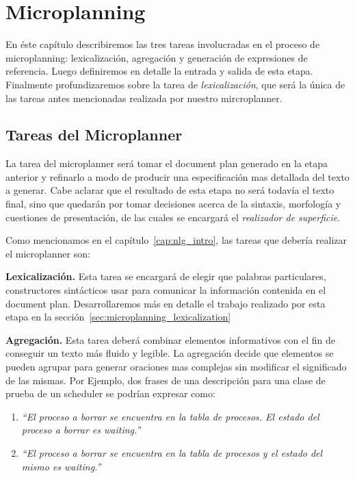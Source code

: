 \chapter{Microplanning}
\label{cap:microplanning}

En éste capítulo describiremos las tres tareas involucradas en el proceso de microplanning: lexicalización, agregación y generación de expresiones de referencia. Luego definiremos en detalle la entrada y salida de esta etapa. Finalmente profundizaremos sobre la tarea de \emph{lexicalización}, que será la única de las tareas antes mencionadas realizada por nuestro mircroplanner. 
\section{Tareas del Microplanner}

La tarea del microplanner será tomar el document plan generado en la etapa anterior y refinarlo a modo de producir una especificación mas detallada del texto a generar. Cabe aclarar que el resultado de esta etapa no será todavía el texto final, sino que quedarán por tomar decisiones acerca de la sintaxis, morfología y cuestiones de presentación, de las cuales se encargará el \emph{realizador de superficie}.

Como mencionamos en el capítulo~\ref{cap:nlg_intro}, las tareas que debería realizar el microplanner son:

\medskip
\noindent
\textbf{Lexicalización.} Esta tarea se encargará de elegir que palabras particulares, constructores sintácticos usar para comunicar la información contenida en el document plan. Desarrollaremos más en detalle el trabajo realizado por esta etapa en la sección~\ref{sec:microplanning_lexicalization}


\medskip
\noindent
\textbf{Agregación.} Esta tarea deberá combinar elementos informativos con el fin de conseguir un texto más fluido y legible. La agregación decide que elementos se pueden agrupar para generar oraciones mas complejas sin modificar el significado de las mismas. Por Ejemplo, dos frases de una descripción para una clase de prueba de un scheduler se podrían expresar como:

\begin{center}
\begin{enumerate}
  \item \emph{``El proceso a borrar se encuentra en la tabla de procesos. El estado del proceso a borrar es waiting.''} 
  \item \emph{``El proceso a borrar se encuentra en la tabla de procesos y el estado del mismo es waiting.''}
\end{enumerate}
\end{center}


